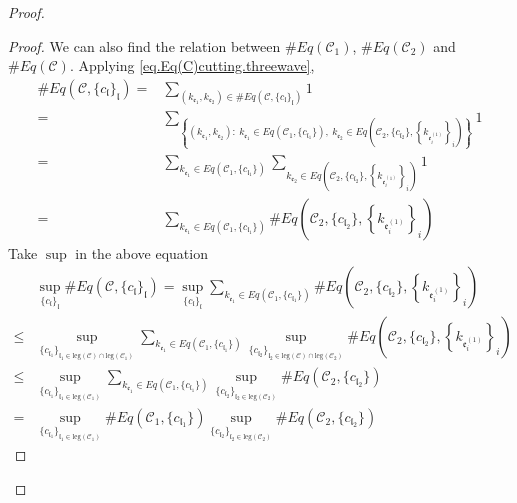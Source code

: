 \begin{proof}
\begin{proof}
We can also find the relation between $\#Eq(\mathcal{C}_1)$, $\#Eq(\mathcal{C}_2)$ and $\#Eq(\mathcal{C})$. Applying \eqref{eq.Eq(C)cutting.threewave},
\begin{equation}
\begin{split}
    \#Eq(\mathcal{C},\{c_{\mathfrak{l}}\}_{\mathfrak{l}})=&\sum_{(k_{\mathfrak{e}_1},k_{\mathfrak{e}_{2}})\in \#Eq(\mathcal{C},\{c_{\mathfrak{l}}\}_{\mathfrak{l}})} 1
    \\
    =&\sum_{\left\{(k_{\mathfrak{e}_1},k_{\mathfrak{e}_{2}}):\ k_{\mathfrak{e}_1}\in Eq(\mathcal{C}_1,\{c_{\mathfrak{l}_1}\}),\  k_{\mathfrak{e}_{2}}\in Eq\left(\mathcal{C}_{2}, \{c_{\mathfrak{l}_2}\}, \left\{k_{\mathfrak{e}_{i}^{(1)}}\right\}_{i}\right)\right\}} 1
    \\
    =&\sum_{k_{\mathfrak{e}_1}\in Eq(\mathcal{C}_1,\{c_{\mathfrak{l}_1}\})} \sum_{k_{\mathfrak{e}_{2}}\in Eq\left(\mathcal{C}_{2}, \{c_{\mathfrak{l}_2}\}, \left\{k_{\mathfrak{e}_{i}^{(1)}}\right\}_{i}\right)} 1
    \\
    =&\sum_{k_{\mathfrak{e}_1}\in Eq(\mathcal{C}_1,\{c_{\mathfrak{l}_1}\})} \# Eq\left(\mathcal{C}_{2}, \{c_{\mathfrak{l}_2}\}, \left\{k_{\mathfrak{e}_{i}^{(1)}}\right\}_{i}\right)
\end{split}
\end{equation}
Take $\sup$ in the above equation
\begin{equation}
\begin{split}
    &\sup_{\{c_{\mathfrak{l}}\}_{\mathfrak{l}}}\#Eq(\mathcal{C},\{c_{\mathfrak{l}}\}_{\mathfrak{l}})
    =\sup_{\{c_{\mathfrak{l}}\}_{\mathfrak{l}}}\sum_{k_{\mathfrak{e}_1}\in Eq(\mathcal{C}_1,\{c_{\mathfrak{l}_1}\})} \# Eq\left(\mathcal{C}_{2}, \{c_{\mathfrak{l}_2}\}, \left\{k_{\mathfrak{e}_{i}^{(1)}}\right\}_{i}\right)
    \\
    \le &\sup_{\{c_{\mathfrak{l}_1}\}_{\mathfrak{l}_1\in \text{leg}(\mathcal{C})\cap \text{leg}(\mathcal{C}_1)} }\sum_{k_{\mathfrak{e}_1}\in Eq(\mathcal{C}_1,\{c_{\mathfrak{l}_1}\})} \sup_{\{c_{\mathfrak{l}_2}\}_{\mathfrak{l}_2\in \text{leg}(\mathcal{C})\cap \text{leg}(\mathcal{C}_2)} }\# Eq\left(\mathcal{C}_{2}, \{c_{\mathfrak{l}_2}\}, \left\{k_{\mathfrak{e}_{i}^{(1)}}\right\}_{i}\right)
    \\
    \le &\sup_{\{c_{\mathfrak{l}_1}\}_{\mathfrak{l}_1\in \text{leg}(\mathcal{C}_1)} }\sum_{k_{\mathfrak{e}_1}\in Eq(\mathcal{C}_1,\{c_{\mathfrak{l}_1}\})} \sup_{\{c_{\mathfrak{l}_2}\}_{\mathfrak{l}_2\in \text{leg}(\mathcal{C}_2)} }\# Eq(\mathcal{C}_{2}, \{c_{\mathfrak{l}_2}\})
    \\
    = &\sup_{\{c_{\mathfrak{l}_1}\}_{\mathfrak{l}_1\in \text{leg}(\mathcal{C}_1)} } \# Eq(\mathcal{C}_1,\{c_{\mathfrak{l}_1}\}) \sup_{\{c_{\mathfrak{l}_2}\}_{\mathfrak{l}_2\in \text{leg}(\mathcal{C}_2)} }\# Eq(\mathcal{C}_{2}, \{c_{\mathfrak{l}_2}\})
\end{split}
\end{equation}


\end{proof}
\end{proof}
